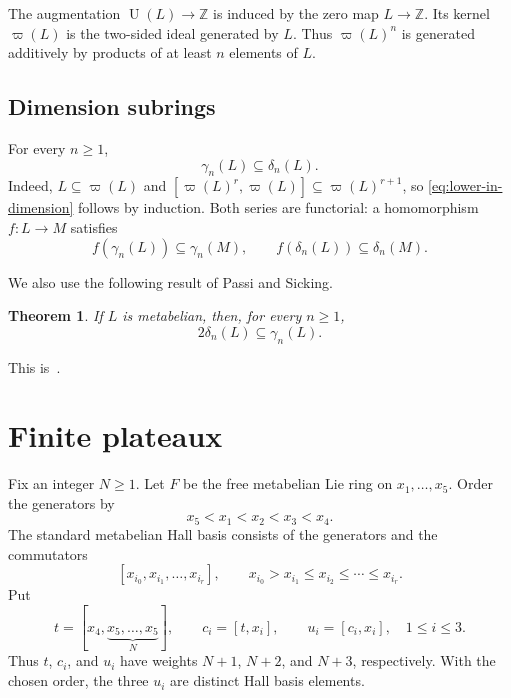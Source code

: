 \documentclass[a4paper,11pt,reqno]{amsart}
\newtheorem{theorem}{Theorem}[section]
\theoremstyle{definition}
\newcommand{\Z}{\mathbb Z}
\newcommand{\U}{\operatorname U}
\begin{document}
The augmentation $\U(L)\to\Z$ is induced by the zero map $L\to\Z$.  Its
kernel $\varpi(L)$ is the two-sided ideal generated by $L$.  Thus
$\varpi(L)^n$ is generated additively by products of at least $n$ elements
of $L$.

\subsection{Dimension subrings}

For every $n\geq1$,
\begin{equation}\label{eq:lower-in-dimension}
                         \gamma_n(L)\subseteq\delta_n(L).
\end{equation}
Indeed, $L\subseteq\varpi(L)$ and
$[\varpi(L)^r,\varpi(L)]\subseteq\varpi(L)^{r+1}$, so
\eqref{eq:lower-in-dimension} follows by induction.  Both series are
functorial: a homomorphism $f:L\to M$ satisfies
\[
 f(\gamma_n(L))\subseteq\gamma_n(M),
 \qquad
 f(\delta_n(L))\subseteq\delta_n(M).
\]

We also use the following result of Passi and Sicking.

\begin{theorem}\label{thm:Passi-Sicking}
If $L$ is metabelian, then, for every $n\geq1$,
\[
             2\delta_n(L)\subseteq\gamma_n(L).
\]
\end{theorem}

This is~\cite[Theorem~1.1]{PassiSicking2017}.

\section{Finite plateaux}\label{sec:plateaux}

Fix an integer $N\geq1$.  Let $F$ be the free metabelian Lie ring on
$x_1,\ldots,x_5$.  Order the generators by
\[
                         x_5<x_1<x_2<x_3<x_4.
\]
The standard metabelian Hall basis consists of the generators and the
commutators
\[
 [x_{i_0},x_{i_1},\ldots,x_{i_r}],
 \qquad
 x_{i_0}>x_{i_1}\leq x_{i_2}\leq\cdots\leq x_{i_r}.
\]
Put
\[
 t=[x_4,\underbrace{x_5,\ldots,x_5}_{N}],
 \qquad
 c_i=[t,x_i],
 \qquad
 u_i=[c_i,x_i],
 \quad 1\leq i\leq3.
\]
Thus $t$, $c_i$, and $u_i$ have weights $N+1$, $N+2$, and $N+3$,
respectively.  With the chosen order, the three $u_i$ are distinct Hall
basis elements.
\end{document}
